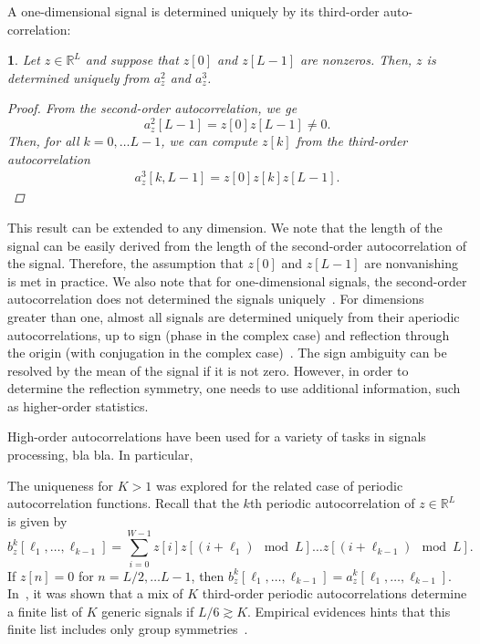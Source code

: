 \documentclass[english,11pt]{article}
\newcommand{\TODO}[1]{{\color{red}{[#1]}}}
\numberwithin{equation}{section}
\theoremstyle{plain}
\theoremstyle{definition}
\theoremstyle{remark}
\theoremstyle{plain}
\theoremstyle{remark}
\theoremstyle{plain}
\theoremstyle{plain}
\newtheorem{proposition}[thm]{\protect\propositionname}
\providecommand{\propositionname}{Proposition}
\newcommand{\RL}{\mathbb{R}^L}
\begin{document}
A one-dimensional signal is determined uniquely by its third-order auto-correlation:
\begin{proposition} \label{prop:uniqueness}
	Let $z\in\RL$ and suppose that $z[0]$ and $z[L-1]$ are nonzeros. Then, $z$  is determined uniquely from  $a_z^2$ and $a_z^3$.
	\begin{proof}
		From the second-order autocorrelation, we ge
		\begin{equation*}
		a_z^2[L-1] = z[0]z[L-1]\neq 0.
		\end{equation*}
		Then, for all $k=0,\ldots L-1$,  we can compute $z[k]$  from the third-order autocorrelation
		\begin{eqnarray}
		a_z^3[k,L-1] = z[0]z[k]z[L-1].
		\end{eqnarray}
	\end{proof}
\end{proposition}
\noindent This result can be extended to any dimension.
We note that the length of the signal can be easily derived from the length of the second-order autocorrelation of the signal. Therefore, the assumption that $z[0]$ and $z[L-1]$ are nonvanishing is met in practice. We also note that for one-dimensional signals, the second-order autocorrelation does not determined the signals uniquely~\cite{beinert2015ambiguities,bendory2017fourier}. For dimensions greater than one, almost all signals are determined uniquely from their aperiodic autocorrelations, up to sign (phase in the complex case) and reflection through the origin (with conjugation in the complex case)~\cite{hayes1982reconstruction,hayes1982reducible}. The sign ambiguity can be resolved by the mean of the signal if it is not zero. However,  in order to determine the reflection symmetry, one needs to use additional information, such as higher-order statistics.

High-order autocorrelations have been used for a variety of tasks in signals processing, bla bla. In particular, \TODO{Here we should refer to Gianakis's paper}



The uniqueness for $K>1$ was explored  for the related case of  periodic autocorrelation functions. Recall that the $k$th periodic autocorrelation of $z\in\mathbb{R}^L$ is given by
\begin{equation*}
b_z^k[\ell_1,\ldots,\ell_{k-1}] =  \sum_{i=0}^{W-1} z[i]z[(i+\ell_1)\mod L]\ldots z[(i+\ell_{k-1})\mod L].
\end{equation*}
If $z[n]=0$ for $n=L/2,\ldots L-1$, then  $b_z^k[\ell_1,\ldots,\ell_{k-1}] = a_z^k[\ell_1,\ldots,\ell_{k-1}]$. 
In~\cite{bandeira2017estimation}, it was shown that a mix of $K$ third-order periodic autocorrelations determine  a finite list of $K$ generic signals if $L/6\gtrsim K$. Empirical evidences hints that this finite list includes only group symmetries~\cite{boumal2017heterogeneous}.
\end{document}
